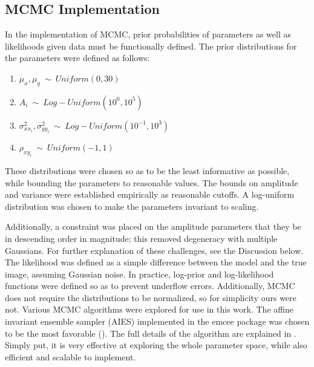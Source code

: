 \documentclass[authoryear, 12pt, 5p, times]{elsarticle}
\begin{document}
\subsection{MCMC Implementation}

In the implementation of MCMC, prior probabilities of parameters as well as likelihoods given data must be functionally defined. The prior distributions for the parameters were defined as follows:
\begin{center}
\begin{enumerate}
	\renewcommand{\theenumi}{\Roman{enumi}:}
    \item $\mu_x, \mu_y \: \sim \: Uniform(0, 30)$
	\item $A_i \: \sim \: Log-Uniform(10^{0}, 10^{5})$
	\item $\sigma^2_{xx_i}, \sigma^2_{yy_i} \: \sim \: Log-Uniform(10^{-1}, 10^{3})$
	\item $\rho_{xy_i} \: \sim \: Uniform(-1, 1)$
\end{enumerate}
\end{center}

These distributions were chosen so as to be the least informative as possible, while bounding the parameters to reasonable values. The bounds on amplitude and variance were established empirically as reasonable cutoffs. A log-uniform distribution was chosen to make the parameters invariant to scaling. 

Additionally, a constraint was placed on the amplitude parameters that they be in descending order in magnitude; this removed degeneracy with multiple Gaussians. For further explanation of these challenges, see the Discussion below. The likelihood was defined as a simple difference between the model and the true image, assuming Gaussian noise. In practice, log-prior and log-likelihood functions were defined so as to prevent underflow errors. Additionally, MCMC does not require the distributions to be normalized, so for simplicity ours were not. 
Various MCMC algorithms were explored for use in this work. The affine invariant ensemble sampler (AIES) implemented in the emcee package was chosen to be the most favorable (\cite{emcee}). The full details of the algorithm are explained in \cite{GandW}. Simply put, it is very effective at exploring the whole parameter space, while also efficient and scalable to implement. 
\end{document}
